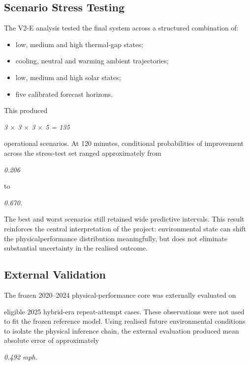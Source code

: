 \subsection{Scenario Stress Testing}
The V2-E analysis tested the final system across a structured combination of:

\begin{itemize}
\item low, medium and high thermal-gap states;
\item cooling, neutral and warming ambient trajectories;
\item low, medium and high solar states;
\item five calibrated forecast horizons.
\end{itemize}

This produced

\begin{center}\textit{3 \ensuremath{\times} 3 \ensuremath{\times} 3 \ensuremath{\times} 5 = 135}\end{center}

operational scenarios. At 120 minutes, conditional probabilities of improvement across the stress-test set ranged approximately from

\begin{center}\textit{0.206}\end{center}

to

\begin{center}\textit{0.670.}\end{center}

The best and worst scenarios still retained wide predictive intervals. This result reinforces the central interpretation of the project: environmental state can shift the physicalperformance distribution meaningfully, but does not eliminate substantial uncertainty in the realised outcome.

\subsection{External Validation}
The frozen 2020--2024 physical-performance core was externally evaluated on

eligible 2025 hybrid-era repeat-attempt cases. These observations were not used to fit the frozen reference model. Using realised future environmental conditions to isolate the physical inference chain, the external evaluation produced mean absolute error of approximately

\begin{center}\textit{0.492 mph.}\end{center}

